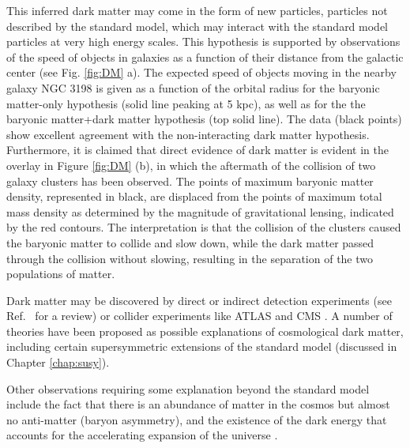 This inferred dark matter may come in the form of new particles, particles not described by the standard model, which may interact with the standard model particles at very high energy scales. This hypothesis is supported by observations of the speed of objects in galaxies as a function of their distance from the galactic center (see Fig. \ref{fig:DM} a). 
The expected speed of objects moving in the nearby galaxy NGC 3198 is given as a function of the orbital radius for the baryonic matter-only hypothesis (solid line peaking at 5 kpc), as well as for the  the baryonic matter+dark matter hypothesis (top solid line). The data (black points) show excellent agreement with the non-interacting dark matter hypothesis. Furthermore, it is claimed that direct evidence of dark matter is evident in the overlay in Figure \ref{fig:DM} (b), in which the aftermath of the collision of two galaxy clusters has been observed. The points of maximum baryonic matter density, represented in black, are displaced from the points of maximum total mass density as determined by the magnitude of gravitational lensing, indicated by the red contours. The interpretation is that the collision of the clusters caused the baryonic matter to collide and slow down, while the dark matter passed through the collision without slowing, resulting in the separation of the two populations of matter.

Dark matter may be discovered by direct or indirect detection experiments (see Ref.~\cite{Undagoitia:2015gya} for a review) or collider experiments like ATLAS \cite{Aad:2008zzm} and CMS \cite{Chatrchyan:2008aa}. A number of theories have been proposed as possible explanations of cosmological dark matter, including certain supersymmetric extensions of the standard model (discussed in Chapter \ref{chap:susy}).


Other observations requiring some explanation beyond the standard model include the fact that there is an abundance of matter in the cosmos but almost no anti-matter (baryon asymmetry), and the existence of the dark energy that accounts for the accelerating expansion of the universe \cite{Goldhaber:2009qu}.

